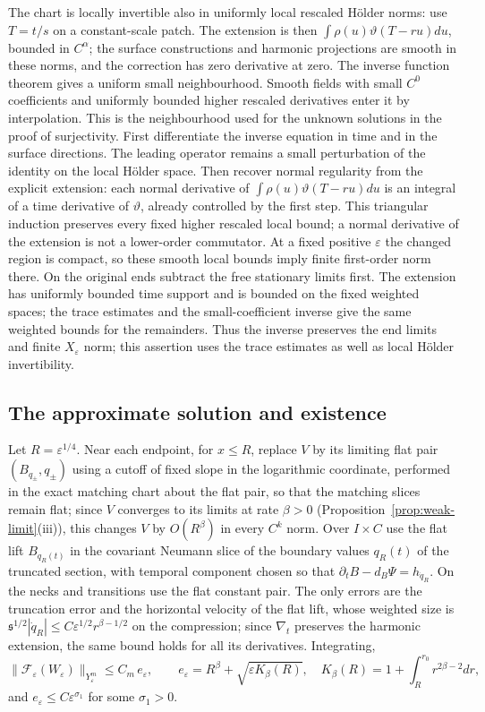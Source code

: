 \documentclass[11pt]{amsart}
\theoremstyle{definition}
\theoremstyle{remark}
\theoremstyle{plain}
\numberwithin{equation}{section}
\newcommand{\eps}{\varepsilon}
\begin{document}
The chart is locally invertible also in uniformly local rescaled
H\"older norms: use $T=t/s$ on a constant-scale patch. The extension
is then $\int\rho(u)\vartheta(T-ru)du$, bounded in $C^\alpha$;
the surface constructions and harmonic projections are smooth in
these norms, and the correction has zero derivative at zero.
The inverse function theorem gives a uniform small neighbourhood.
Smooth fields with small $C^0$ coefficients and uniformly bounded
higher rescaled derivatives enter it by interpolation. This is the
neighbourhood used for the unknown solutions in the proof of surjectivity.
First differentiate the inverse equation in time and in the surface
directions. The leading operator remains a small perturbation of
the identity on the local H\"older space. Then recover normal
regularity from the explicit extension: each normal derivative of
$\int\rho(u)\vartheta(T-ru)du$ is an integral of a time derivative
of $\vartheta$, already controlled by the first step. This triangular
induction preserves every fixed higher rescaled local bound; a
normal derivative of the extension is not a lower-order commutator. At a fixed positive $\eps$ the changed region
is compact, so these smooth local bounds imply finite first-order
norm there. On the original ends subtract the free stationary
limits first. The extension has uniformly bounded time support and
is bounded on the fixed weighted spaces; the trace estimates and
the small-coefficient inverse give the same weighted bounds for the
remainders. Thus the inverse preserves the end limits and finite
$X_\eps$ norm; this assertion uses the trace estimates as well as
local H\"older invertibility.

\subsection{The approximate solution and existence}

Let $R=\eps^{1/4}$. Near each endpoint, for $x\le R$, replace $V$ by its limiting
flat pair $(B_{q_\pm},q_\pm)$ using a cutoff of fixed slope in the logarithmic
coordinate, performed in the exact matching chart about the flat pair, so that
the matching slices remain flat; since $V$ converges to its limits at rate $\beta>0$
(Proposition~\ref{prop:weak-limit}(iii)), this changes $V$ by $O(R^\beta)$ in every
$C^k$ norm. Over $I\times C$ use the flat lift $B_{q_R(t)}$ in the covariant
Neumann slice of the boundary values $q_R(t)$ of the truncated section, with
temporal component chosen so that $\partial_tB-d_B\Psi=h_{\dot q_R}$. On the necks
and transitions use the flat constant pair. The only errors are the truncation
error and the horizontal velocity of the flat lift, whose weighted size is
${\mathfrak s}^{1/2}|\dot q_R|\le C\eps^{1/2}r^{\beta-1/2}$ on the compression; since
$\nabla_t$ preserves the harmonic extension, the same bound holds for all its
derivatives. Integrating,
\begin{equation}\label{eq:approx-error}
\|\mathcal F_\eps(W_\eps)\|_{Y^m_\eps}\le C_m\,e_\eps,\qquad
e_\eps=R^\beta+\sqrt{\eps K_\beta(R)},\quad
K_\beta(R)=1+\int_R^{r_0}r^{2\beta-2}dr ,
\end{equation}
and $e_\eps\le C\eps^{\sigma_1}$ for some $\sigma_1>0$.
\end{document}
